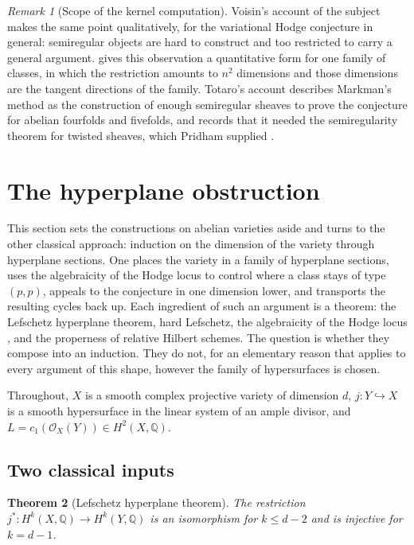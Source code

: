 \documentclass[11pt,reqno]{amsart}
\theoremstyle{plain}
\newtheorem{theorem}{Theorem}[section]
\theoremstyle{definition}
\theoremstyle{remark}
\newtheorem{remark}[theorem]{Remark}
\newcommand{\QQ}{\mathbb{Q}}
\newcommand{\cO}{\mathcal{O}}
\begin{document}
\begin{remark}[Scope of the kernel computation]
Voisin's account of the subject \cite{Voi26} makes the same point
qualitatively, for the variational Hodge conjecture in general: semiregular
objects are hard to construct and too restricted to carry a general argument.
 gives this observation a quantitative form for one
family of classes, in which the restriction amounts to $n^{2}$ dimensions and
those dimensions are the tangent directions of the family. Totaro's account
\cite{Tot26} describes Markman's method as the construction of enough
semiregular sheaves to prove the conjecture for abelian fourfolds and
fivefolds, and records that it needed the semiregularity theorem for twisted
sheaves, which Pridham supplied \cite{Pri24}.
\end{remark}

\section{The hyperplane obstruction}\label{sec:hyperplane}

This section sets the constructions on abelian varieties aside and turns to
the other classical approach: induction on the dimension of the variety
through hyperplane sections. One places the variety in a family of hyperplane
sections, uses the algebraicity of the Hodge locus to control where a class
stays of type $(p,p)$, appeals to the conjecture in one dimension lower, and
transports the resulting cycles back up. Each ingredient of such
an argument is a theorem: the Lefschetz hyperplane theorem, hard Lefschetz,
the algebraicity of the Hodge locus \cite{CDK95}, and the properness of
relative Hilbert schemes. The question is whether they compose into an
induction. They do not, for an elementary reason that applies to every
argument of this shape, however the family of hypersurfaces is chosen.

Throughout, $X$ is a smooth complex projective variety of dimension $d$,
$j\colon Y\hookrightarrow X$ is a smooth hypersurface in the linear system of
an ample divisor, and $L=c_{1}(\cO_{X}(Y))\in H^{2}(X,\QQ)$.

\subsection{Two classical inputs}

\begin{theorem}[Lefschetz hyperplane theorem]\label{thm:LHT}
The restriction $j^{*}\colon H^{k}(X,\QQ)\to H^{k}(Y,\QQ)$ is an isomorphism
for $k\le d-2$ and is injective for $k=d-1$.
\end{theorem}
\end{document}
